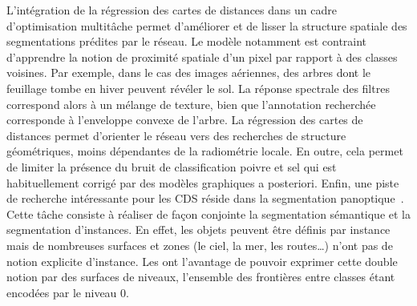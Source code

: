 L'intégration de la régression des cartes de distances dans un cadre d'optimisation multitâche permet d'améliorer et de lisser la structure spatiale des segmentations prédites par le réseau. Le modèle notamment est contraint d'apprendre la notion de proximité spatiale d'un pixel par rapport à des classes voisines. Par exemple, dans le cas des images aériennes, des arbres dont le feuillage tombe en hiver peuvent révéler le sol. La réponse spectrale des filtres correspond alors à un mélange de texture, bien que l'annotation recherchée corresponde à l'enveloppe convexe de l'arbre. La régression des cartes de distances permet d'orienter le réseau vers des recherches de structure géométriques, moins dépendantes de la radiométrie locale. En outre, cela permet de limiter la présence du bruit de classification poivre et sel qui est habituellement corrigé par des modèles graphiques a posteriori.
Enfin, une piste de recherche intéressante pour les \gls{CDS} réside dans la segmentation panoptique~\cite{kirillov_panoptic_2018}. Cette tâche consiste à réaliser de façon conjointe la segmentation sémantique et la segmentation d'instances. En effet, les objets peuvent être définis par instance mais de nombreuses surfaces et zones (le ciel, la mer, les routes\dots) n'ont pas de notion explicite d'instance. Les  ont l'avantage de pouvoir exprimer cette double notion par des surfaces de niveaux, l'ensemble des frontières entre classes étant encodées par le niveau 0.


%
%
\printbibliography[heading=subbibliography]
